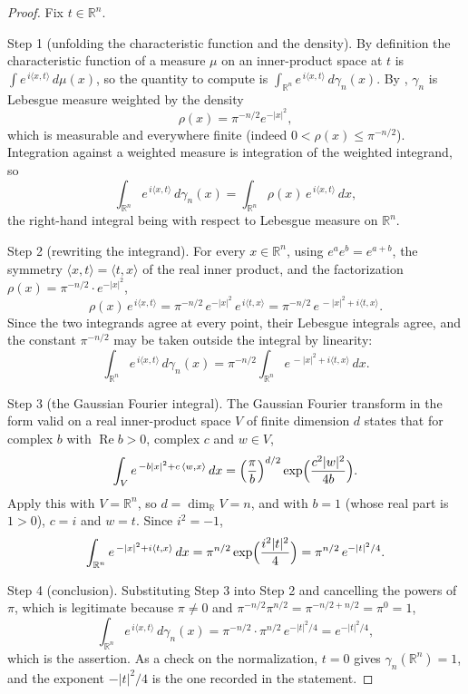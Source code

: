 \begin{proof}
Fix $t \in \mathbb{R}^n$.

Step 1 (unfolding the characteristic function and the density).  By definition
the characteristic function of a measure $\mu$ on an inner-product space at $t$
is $\int e^{\,i\langle x,t\rangle}\,d\mu(x)$, so the quantity to compute is
$\int_{\mathbb{R}^n} e^{\,i\langle x,t\rangle}\,d\gamma_n(x)$.  By
, $\gamma_n$ is Lebesgue measure weighted by the density
\[
  \rho(x) = \pi^{-n/2} e^{-|x|^2} ,
\]
which is measurable and everywhere finite (indeed $0 < \rho(x) \le \pi^{-n/2}$).
Integration against a weighted measure is integration of the weighted integrand,
so
\[
  \int_{\mathbb{R}^n} e^{\,i\langle x,t\rangle} \, d\gamma_n(x)
    = \int_{\mathbb{R}^n} \rho(x)\, e^{\,i\langle x,t\rangle} \, dx ,
\]
the right-hand integral being with respect to Lebesgue measure on
$\mathbb{R}^n$.

Step 2 (rewriting the integrand).  For every $x \in \mathbb{R}^n$, using
$e^{a}e^{b} = e^{a+b}$, the symmetry $\langle x,t\rangle = \langle t,x\rangle$ of
the real inner product, and the factorization
$\rho(x) = \pi^{-n/2}\cdot e^{-|x|^2}$,
\[
  \rho(x)\, e^{\,i\langle x,t\rangle}
    = \pi^{-n/2}\, e^{-|x|^2}\, e^{\,i \langle t,x\rangle}
    = \pi^{-n/2}\, e^{\,-|x|^2 + i\langle t, x\rangle} .
\]
Since the two integrands agree at every point, their Lebesgue integrals agree,
and the constant $\pi^{-n/2}$ may be taken outside the integral by linearity:
\[
  \int_{\mathbb{R}^n} e^{\,i\langle x,t\rangle}\, d\gamma_n(x)
    = \pi^{-n/2} \int_{\mathbb{R}^n}
        e^{\,-|x|^2 + i \langle t, x\rangle} \, dx .
\]

Step 3 (the Gaussian Fourier integral).  The Gaussian Fourier transform in the
form valid on a real inner-product space $V$ of finite dimension $d$ states that
for complex $b$ with $\operatorname{Re} b > 0$, complex $c$ and $w \in V$,
\[
  \int_V e^{\,-b|x|^2 + c\,\langle w, x\rangle} \, dx
    = \Bigl(\frac{\pi}{b}\Bigr)^{d/2}
      \exp\Bigl(\frac{c^2 |w|^2}{4b}\Bigr) .
\]
Apply this with $V = \mathbb{R}^n$, so $d = \dim_{\mathbb{R}} V = n$, and with
$b = 1$ (whose real part is $1 > 0$), $c = i$ and $w = t$.  Since $i^2 = -1$,
\[
  \int_{\mathbb{R}^n} e^{\,-|x|^2 + i\langle t, x\rangle} \, dx
    = \pi^{n/2} \exp\Bigl(\frac{i^2 |t|^2}{4}\Bigr)
    = \pi^{n/2}\, e^{-|t|^2/4} .
\]

Step 4 (conclusion).  Substituting Step 3 into Step 2 and cancelling the
powers of $\pi$, which is legitimate because $\pi \neq 0$ and
$\pi^{-n/2}\pi^{n/2} = \pi^{-n/2 + n/2} = \pi^0 = 1$,
\[
  \int_{\mathbb{R}^n} e^{\,i\langle x,t\rangle} \, d\gamma_n(x)
    = \pi^{-n/2}\cdot \pi^{n/2}\, e^{-|t|^2/4}
    = e^{-|t|^2/4} ,
\]
which is the assertion.  As a check on the normalization, $t = 0$ gives
$\gamma_n(\mathbb{R}^n) = 1$, and the exponent $-|t|^2/4$ is the one recorded in
the statement.
\end{proof}

